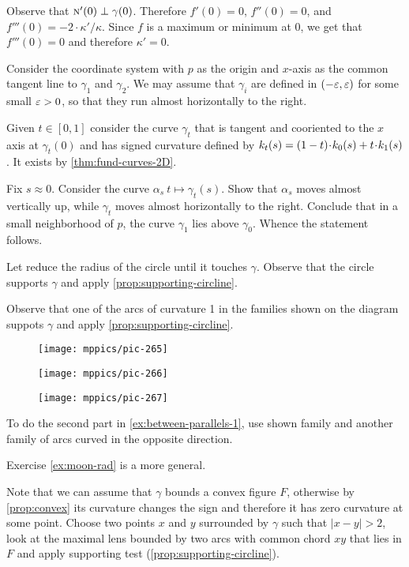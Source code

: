 Observe that $\textsc{n}'(0)\perp\gamma(0)$.
Therefore $f'(0)=0$, $f''(0)=0$, and $f'''(0)=-2\cdot\kappa'/\kappa$.
Since $f$ is a maximum or minimum at $0$, we get that $f'''(0)=0$ and therefore
$\kappa'=0$.

 Consider the coordinate system with $p$ as the origin and $x$-axis as the common tangent line to $\gamma_1$ and $\gamma_2$.
We may assume that $\gamma_i$ are defined in $(-\varepsilon,\varepsilon)$ for some small $\varepsilon>0$,
so that they run almost horizontally to the right.

Given $t\in[0,1]$ consider the curve $\gamma_t$ that is tangent and cooriented to the $x$ axis at  $\gamma_t(0)$ and has signed curvature defined by $\skur_t(s)=(1-t)\cdot\skur_0(s)+t\cdot\skur_1(s)$.
It exists by \ref{thm:fund-curves-2D}.

Fix $s\approx 0$.
Consider the curve $\alpha_s\:t\mapsto \gamma_t(s)$.
Show that $\alpha_s$ moves almost vertically up, while $\gamma_t$ moves almost horizontally to the right.
Conclude that in a small neighborhood of $p$, the curve $\gamma_1$
lies above $\gamma_0$.
Whence the statement follows.

 Let reduce the radius of the circle until it touches $\gamma$.
Observe that the circle supports $\gamma$ and apply \ref{prop:supporting-circline}.


Observe that one of the arcs of curvature 1 in the families shown on the diagram suppots $\gamma$ and apply \ref{prop:supporting-circline}.
\begin{figure}[h!]
\begin{minipage}{.50\textwidth}
\centering
\texttt{[image: mppics/pic-265]}
\end{minipage}\hfill
\begin{minipage}{.26\textwidth}
\centering
\texttt{[image: mppics/pic-266]}
\end{minipage}
\hfill
\begin{minipage}{.20\textwidth}
\centering
\texttt{[image: mppics/pic-267]}
\end{minipage}
\end{figure}
To do the second part in \ref{ex:between-parallels-1}, use shown family and another family of arcs curved in the opposite direction.

Exercise \ref{ex:moon-rad} is a more general. 

Note that we can assume that $\gamma$ bounds a convex figure $F$, otherwise by \ref{prop:convex} its curvature changes the sign and therefore it has zero curvature at some point.
Choose two points $x$ and $y$ surrounded by $\gamma$ such that $|x-y|>2$,
look at the maximal lens bounded by two arcs with common chord $xy$ that lies in $F$ and apply supporting test (\ref{prop:supporting-circline}).

